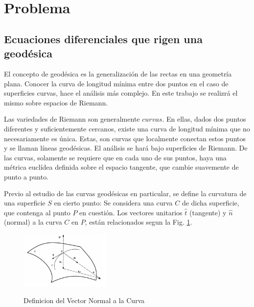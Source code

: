 \documentclass{endm}
\begin{document}
%
\section{Problema}\label{Problema}

\subsection{Ecuaciones diferenciales que rigen una geod\'esica}


\tab El concepto de geod\'esica es la generalizaci\'on de las rectas en una geometr\'ia plana. Conocer la curva de longitud m\'inima entre dos puntos en el caso de superficies curvas, hace el an\'alisis m\'as complejo. En este trabajo se realizr\'a el mismo sobre espacios de Riemann.


Las variedades de Riemann son generalmente $curvas$. En ellas, dados dos puntos diferentes y suficientemente cercanos, existe una curva de longitud m\'inima que no necesariamente es \'unica. Estas, son curvas que localmente conectan estos puntos y se llaman l\'ineas geod\'esicas.
El an\'alisis se har\'a bajo superficies de Riemann. De las curvas, solamente se requiere que en cada uno de sus puntos, haya una m\'etrica eucl\'idea definida sobre el espacio tangente, que cambie suavemente de punto a punto.


Previo al estudio de las curvas geod\'esicas en particular, se define la curvatura de una superficie $S$ en cierto punto: Se considera una curva $C$ de dicha superficie, que contenga al punto $P$ en cuesti\'on. Los vectores unitarios $\hat{t}$ (tangente) y $\hat{n}$ (normal) a la curva $C$ en $P$, est\'an relacionados segun la Fig. \ref{fig:vectores}.\\

\begin{figure}[H]
\caption{Definicion del Vector Normal a la Curva}
\centering
\includegraphics[width=0.4\textwidth]{Vector_Normal.jpg}
\label{fig:vectores}
\end{figure}
\end{document}
